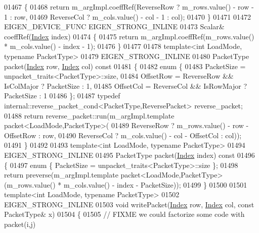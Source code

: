 \begin{DoxyCode}
01467   \{
01468     \textcolor{keywordflow}{return} m\_argImpl.coeffRef(ReverseRow ? m\_rows.value() - row - 1 : row,
01469                               ReverseCol ? m\_cols.value() - col - 1 : col);
01470   \}
01471 
01472   EIGEN\_DEVICE\_FUNC EIGEN\_STRONG\_INLINE
01473   Scalar& coeffRef(\hyperlink{namespace_eigen_a62e77e0933482dafde8fe197d9a2cfde}{Index} index)
01474   \{
01475     \textcolor{keywordflow}{return} m\_argImpl.coeffRef(m\_rows.value() * m\_cols.value() - index - 1);
01476   \}
01477 
01478   \textcolor{keyword}{template}<\textcolor{keywordtype}{int} LoadMode, \textcolor{keyword}{typename} PacketType>
01479   EIGEN\_STRONG\_INLINE
01480   PacketType packet(\hyperlink{namespace_eigen_a62e77e0933482dafde8fe197d9a2cfde}{Index} row, \hyperlink{namespace_eigen_a62e77e0933482dafde8fe197d9a2cfde}{Index} col)\textcolor{keyword}{ const}
01481 \textcolor{keyword}{  }\{
01482     \textcolor{keyword}{enum} \{
01483       PacketSize = unpacket\_traits<PacketType>::size,
01484       OffsetRow  = ReverseRow && IsColMajor ? PacketSize : 1,
01485       OffsetCol  = ReverseCol && IsRowMajor ? PacketSize : 1
01486     \};
01487     \textcolor{keyword}{typedef} internal::reverse\_packet\_cond<PacketType,ReversePacket> reverse\_packet;
01488     \textcolor{keywordflow}{return} reverse\_packet::run(m\_argImpl.template packet<LoadMode,PacketType>(
01489                                   ReverseRow ? m\_rows.value() - row - OffsetRow : row,
01490                                   ReverseCol ? m\_cols.value() - col - OffsetCol : col));
01491   \}
01492 
01493   \textcolor{keyword}{template}<\textcolor{keywordtype}{int} LoadMode, \textcolor{keyword}{typename} PacketType>
01494   EIGEN\_STRONG\_INLINE
01495   PacketType packet(\hyperlink{namespace_eigen_a62e77e0933482dafde8fe197d9a2cfde}{Index} index)\textcolor{keyword}{ const}
01496 \textcolor{keyword}{  }\{
01497     \textcolor{keyword}{enum} \{ PacketSize = unpacket\_traits<PacketType>::size \};
01498     \textcolor{keywordflow}{return} preverse(m\_argImpl.template packet<LoadMode,PacketType>(m\_rows.value() * m\_cols.value() - index 
      - PacketSize));
01499   \}
01500 
01501   \textcolor{keyword}{template}<\textcolor{keywordtype}{int} LoadMode, \textcolor{keyword}{typename} PacketType>
01502   EIGEN\_STRONG\_INLINE
01503   \textcolor{keywordtype}{void} writePacket(\hyperlink{namespace_eigen_a62e77e0933482dafde8fe197d9a2cfde}{Index} row, \hyperlink{namespace_eigen_a62e77e0933482dafde8fe197d9a2cfde}{Index} col, \textcolor{keyword}{const} PacketType& x)
01504   \{
01505     \textcolor{comment}{// FIXME we could factorize some code with packet(i,j)}

\end{DoxyCode}
